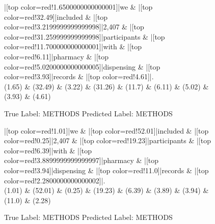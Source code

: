 \documentclass[a4paper, landscape]{article}
\begin{document}
\begin{figure}
\begin{center}
\begin{dependency}
\begin{deptext}
|[top color=red!1.6500000000000001]|we \& |[top color=red!32.49]|included \& |[top color=red!3.2199999999999998]|2,407 \& |[top color=red!31.259999999999998]|participants \& |[top color=red!11.700000000000001]|with \& |[top color=red!6.11]|pharmacy \& |[top color=red!5.0200000000000005]|dispensing \& |[top color=red!3.93]|records \& |[top color=red!4.61]|.\\
(1.65) \& (32.49) \& (3.22) \& (31.26) \& (11.7) \& (6.11) \& (5.02) \& (3.93) \& (4.61)\\
\end{deptext}
\end{dependency}
\end{center}
\caption{True Label: METHODS Predicted Label: METHODS}
\end{figure}
\clearpage
\begin{figure}
\begin{center}
\begin{dependency}
\begin{deptext}
|[top color=red!1.01]|we \& |[top color=red!52.01]|included \& |[top color=red!0.25]|2,407 \& |[top color=red!19.23]|participants \& |[top color=red!6.39]|with \& |[top color=red!3.8899999999999997]|pharmacy \& |[top color=red!3.94]|dispensing \& |[top color=red!11.0]|records \& |[top color=red!2.2800000000000002]|.\\
(1.01) \& (52.01) \& (0.25) \& (19.23) \& (6.39) \& (3.89) \& (3.94) \& (11.0) \& (2.28)\\
\end{deptext}
\end{dependency}
\end{center}
\caption{True Label: METHODS Predicted Label: METHODS}
\end{figure}
\end{document}
